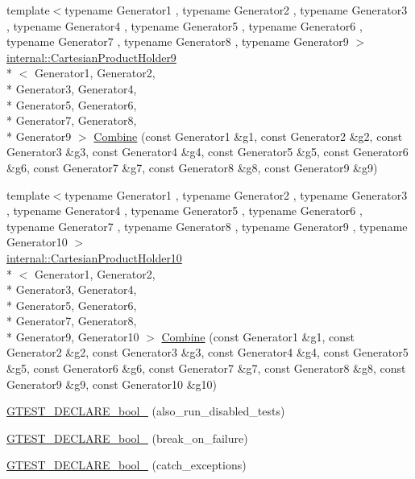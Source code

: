 \begin{DoxyCompactItemize}
{\footnotesize template$<$typename Generator1 , typename Generator2 , typename Generator3 , typename Generator4 , typename Generator5 , typename Generator6 , typename Generator7 , typename Generator8 , typename Generator9 $>$ }\\\hyperlink{classtesting_1_1internal_1_1_cartesian_product_holder9}{internal\-::\-Cartesian\-Product\-Holder9}\\*
$<$ Generator1, Generator2, \\*
Generator3, Generator4, \\*
Generator5, Generator6, \\*
Generator7, Generator8, \\*
Generator9 $>$ \hyperlink{namespacetesting_a928ed7d1e8dd1dde0da5d7d3838384d2}{Combine} (const Generator1 \&g1, const Generator2 \&g2, const Generator3 \&g3, const Generator4 \&g4, const Generator5 \&g5, const Generator6 \&g6, const Generator7 \&g7, const Generator8 \&g8, const Generator9 \&g9)
\item 
{\footnotesize template$<$typename Generator1 , typename Generator2 , typename Generator3 , typename Generator4 , typename Generator5 , typename Generator6 , typename Generator7 , typename Generator8 , typename Generator9 , typename Generator10 $>$ }\\\hyperlink{classtesting_1_1internal_1_1_cartesian_product_holder10}{internal\-::\-Cartesian\-Product\-Holder10}\\*
$<$ Generator1, Generator2, \\*
Generator3, Generator4, \\*
Generator5, Generator6, \\*
Generator7, Generator8, \\*
Generator9, Generator10 $>$ \hyperlink{namespacetesting_a0590cd15c5bafaea9f5d2b1061e0a28b}{Combine} (const Generator1 \&g1, const Generator2 \&g2, const Generator3 \&g3, const Generator4 \&g4, const Generator5 \&g5, const Generator6 \&g6, const Generator7 \&g7, const Generator8 \&g8, const Generator9 \&g9, const Generator10 \&g10)
\item 
\hyperlink{namespacetesting_a4c08ba9fcb0581c61e25968e520efa48}{G\-T\-E\-S\-T\-\_\-\-D\-E\-C\-L\-A\-R\-E\-\_\-bool\-\_\-} (also\-\_\-run\-\_\-disabled\-\_\-tests)
\item 
\hyperlink{namespacetesting_a5868c3980b2f69f511fc8c3de7cdfc17}{G\-T\-E\-S\-T\-\_\-\-D\-E\-C\-L\-A\-R\-E\-\_\-bool\-\_\-} (break\-\_\-on\-\_\-failure)
\item 
\hyperlink{namespacetesting_ab6f1777f7b740f31e41f7da017447b58}{G\-T\-E\-S\-T\-\_\-\-D\-E\-C\-L\-A\-R\-E\-\_\-bool\-\_\-} (catch\-\_\-exceptions)

\end{DoxyCompactItemize}
